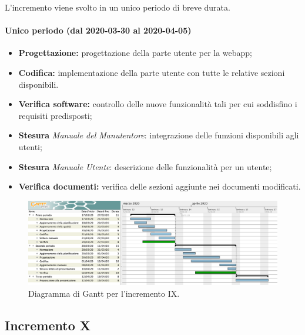 				L'incremento viene svolto in un unico periodo di breve durata.
				
				\paragraph{Unico periodo (dal 2020-03-30 al 2020-04-05)}
				
					\begin{itemize}
						\item \textbf{Progettazione:} progettazione della parte utente per la webapp;
						\item \textbf{Codifica:} implementazione della parte utente con tutte le relative sezioni disponibili.
						\item \textbf{Verifica software:} controllo delle nuove funzionalità tali per cui soddisfino i requisiti predisposti;
						\item \textbf{Stesura} \textit{Manuale del Manutentore}: integrazione delle funzioni disponibili agli utenti;
						\item \textbf{Stesura} \textit{Manuale Utente}: descrizione delle funzionalità per un utente;
						\item \textbf{Verifica documenti:} verifica delle sezioni aggiunte nei documenti modificati.
					\end{itemize} 			

		\begin{landscape}
          \begin{figure}[H]
            \centering
            \includegraphics[width=\linewidth]{images/ganttDettaglioCodifica} %
            \caption{Diagramma di Gantt per l'incremento IX.}
          \end{figure}		
		\end{landscape}


		\subsection{Incremento X}
			
